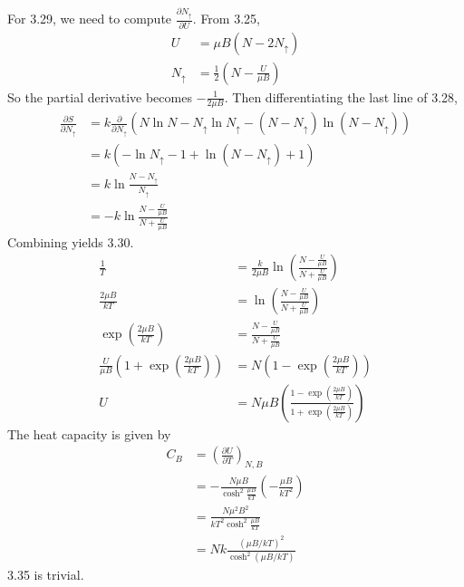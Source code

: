 \documentclass[answers]{exam}
\begin{document}
\begin{questions}
\begin{solution}
    For 3.29, we need to compute $\frac{\partial N_\uparrow}{\partial U}$. From 3.25,
    \begin{align*}
        U &= \mu B(N-2N_\uparrow) \\
        N_\uparrow &= \frac{1}{2}\left(N-\frac{U}{\mu B}\right)
    \end{align*}
    So the partial derivative becomes $-\frac{1}{2\mu B}$. Then differentiating the last line of 3.28,
    \begin{align*}
        \frac{\partial S}{\partial N_\uparrow} &= k\frac{\partial}{\partial N_\uparrow} \left(N\ln N - N_\uparrow \ln N_\uparrow - (N-N_\uparrow)\ln(N-N_\uparrow)\right) \\
                                               &= k(-\ln N_\uparrow - 1 + \ln(N-N_\uparrow) + 1) \\
                                               &= k\ln\frac{N-N_\uparrow}{N_\uparrow} \\
                                               &= -k\ln\frac{N-\frac{U}{\mu B}}{N+\frac{U}{\mu B}}
    \end{align*}
    Combining yields 3.30.
    \begin{align*}
        \frac{1}{T} &= \frac{k}{2\mu B}\ln\left(\frac{N-\frac{U}{\mu B}}{N+\frac{U}{\mu B}}\right) \\
        \frac{2\mu B}{kT} &= \ln\left(\frac{N-\frac{U}{\mu B}}{N+\frac{U}{\mu B}}\right) \\
        \exp\left(\frac{2\mu B}{kT}\right) &= \frac{N-\frac{U}{\mu B}}{N+\frac{U}{\mu B}} \\
        \frac{U}{\mu B}\left(1+\exp\left(\frac{2\mu B}{kT}\right)\right) &= N\left(1-\exp\left(\frac{2\mu B}{kT}\right)\right) \\
        U &= N\mu B\left(\frac{1-\exp\left(\frac{2\mu B}{kT}\right)}{1+\exp\left(\frac{2\mu B}{kT}\right)}\right)
    \end{align*}
    The heat capacity is given by
    \begin{align*}
        C_B &= \left(\frac{\partial U}{\partial T}\right)_{N,B} \\
            &= -\frac{N\mu B}{\cosh^2\frac{\mu B}{kT}} \left(-\frac{\mu B}{kT^2}\right) \\
            &= \frac{N\mu^2B^2}{kT^2\cosh^2\frac{\mu B}{kT}} \\
            &= Nk\frac{(\mu B/kT)^2}{\cosh^2(\mu B/kT)}
    \end{align*}
    3.35 is trivial.
\end{solution}

\end{questions}
\end{document}
